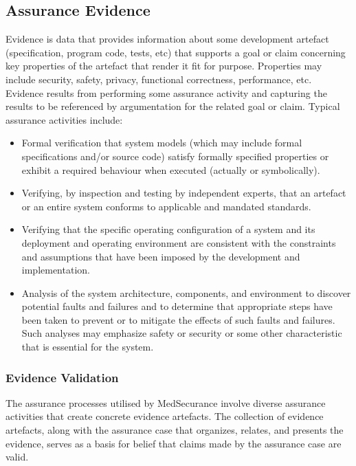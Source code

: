 \documentclass[12pt,twoside,a4paper]{article}
\begin{document}
\hypertarget{assurance-evidence}{%
\subsection{Assurance Evidence}\label{assurance-evidence}}

Evidence is data that provides information about some development artefact (specification, program code, tests, etc) that supports a goal or claim concerning key properties of the artefact that render it fit for purpose. Properties may include security, safety, privacy, functional correctness, performance, etc. Evidence results from performing some assurance activity and capturing the results to be referenced by argumentation for the related goal or claim. Typical assurance activities include:

\begin{itemize}
\item
  Formal verification that system models (which may include formal specifications and/or source code) satisfy formally specified properties or exhibit a required behaviour when executed (actually or symbolically).
\item
  Verifying, by inspection and testing by independent experts, that an artefact or an entire system conforms to applicable and mandated standards.
\item
  Verifying that the specific operating configuration of a system and its deployment and operating environment are consistent with the constraints and assumptions that have been imposed by the development and implementation.
\item
  Analysis of the system architecture, components, and environment to discover potential faults and failures and to determine that appropriate steps have been taken to prevent or to mitigate the effects of such faults and failures. Such analyses may emphasize safety or security or some other characteristic that is essential for the system.
\end{itemize}

\hypertarget{evidence-validation}{%
\subsubsection{Evidence Validation}\label{evidence-validation}}

The assurance processes utilised by MedSecurance involve diverse assurance activities that create concrete evidence artefacts. The collection of evidence artefacts, along with the assurance case that organizes, relates, and presents the evidence, serves as a basis for belief that claims made by the assurance case are valid.
\end{document}
